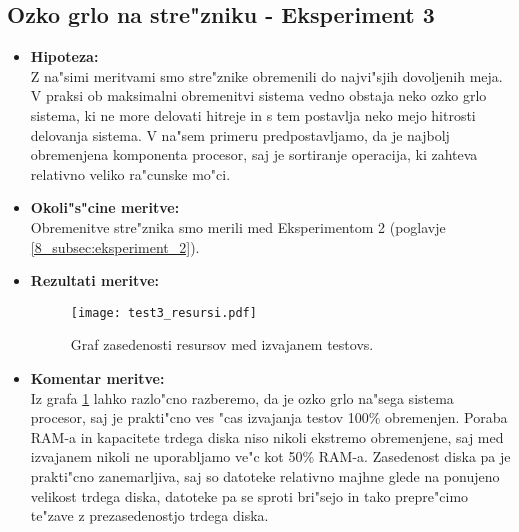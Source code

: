 \newpage
\subsection{Ozko grlo na stre"zniku - Eksperiment 3}
\begin{itemize}
	\item \textbf{Hipoteza: }  \\
		Z na"simi meritvami smo stre"znike obremenili do najvi"sjih dovoljenih meja. V praksi ob maksimalni obremenitvi sistema vedno obstaja neko ozko grlo sistema, ki ne more delovati hitreje in s tem postavlja neko mejo hitrosti delovanja sistema. V na"sem primeru predpostavljamo, da je najbolj obremenjena komponenta procesor, saj je sortiranje operacija, ki zahteva relativno veliko ra"cunske mo"ci. 
			
	\item \textbf{Okoli"s"cine meritve: } \\
		Obremenitve stre"znika smo merili med Eksperimentom 2 (poglavje \ref{8_subsec:eksperiment_2}). 

 	\item \textbf{Rezultati meritve: }  \\
		\begin{figure}[!htb]
  		\centering
  		  \texttt{[image: test3\_resursi.pdf]}
  		\caption{Graf zasedenosti resursov med izvajanem testovs.}
  		\label{8_graf_zasedenost_resursov}
		\end{figure}


	\item \textbf{Komentar meritve: } \\ 
		Iz grafa \ref{8_graf_zasedenost_resursov} lahko razlo"cno razberemo, da je ozko grlo na"sega sistema procesor, saj je prakti"cno ves "cas izvajanja testov 100\% obremenjen. Poraba RAM-a in kapacitete trdega diska niso nikoli ekstremo obremenjene, saj med izvajanem nikoli ne uporabljamo ve"c kot 50\% RAM-a. Zasedenost diska pa je prakti"cno zanemarljiva, saj so datoteke relativno majhne glede na ponujeno velikost trdega diska, datoteke pa se sproti bri"sejo in tako prepre"cimo te"zave z prezasedenostjo trdega diska. 
\end{itemize}

\newpage
